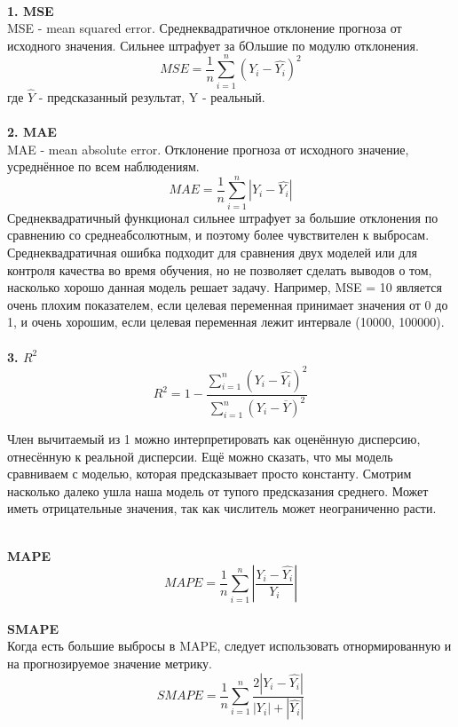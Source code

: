 \ \\\textbf{1. MSE}
\\MSE - mean squared error. Среднеквадратичное отклонение прогноза от исходного значения. Сильнее штрафует за
бОльшие по модулю отклонения.
$$MSE =\frac{1}{n}\sum\limits_{i=1}^{n}(Y_i -\hat{Y_i})^2$$
где $\hat{Y}$ - предсказанный результат, Y - реальный.
\\
\\
\textbf{2. MAE}
\\
MAE - mean absolute error. Отклонение прогноза от исходного значение, усреднённое по всем наблюдениям.
$$MAE =\frac{1}{n}\sum\limits_{i=1}^{n}|Y_i -\hat{Y_i}|$$
Среднеквадратичный функционал сильнее штрафует за большие отклонения по сравнению со среднеабсолютным, и
поэтому более чувствителен к выбросам.
Среднеквадратичная ошибка подходит для сравнения двух моделей или для контроля качества во время обучения, но
не позволяет сделать выводов о том, насколько хорошо данная модель решает задачу. Например, MSE = 10 является очень
плохим показателем, если целевая переменная принимает значения от 0 до 1, и очень хорошим, если целевая переменная
лежит интервале (10000, 100000).
\\
\\
\textbf{3. $R^2$} 
$$R^2 = 1 -
\frac{\sum\limits_{
i=1}^{n}(Y_i - \hat{Y_i})^2}{\sum\limits_{
i=1}^{n}(Y_i - \overline{Y})^2}$$

Член вычитаемый из 1 можно интерпретировать как оценённую дисперсию, отнесённую к реальной дисперсии. Ещё можно сказать, что мы модель сравниваем с моделью, которая предсказывает просто константу. Смотрим насколько далеко ушла наша модель от тупого предсказания среднего.
Может иметь отрицательные значения, так как числитель может неограниченно расти.
\begin{unnecessary}
\ \\
\textbf{MAPE}\\
$$MAPE =\frac{1}{n}\sum\limits_{
i=1}^{n}|\frac{Y_i - \hat{Y_i}}{Y_i}|$$
\\
\textbf{SMAPE}
\\
 Когда есть большие выбросы в MAPE, следует
использовать отнормированную и на прогнозируемое значение метрику.
$$SMAPE =\frac{1}{n}\sum\limits_{
i=1}^{n}\frac{2|Y_i - \hat{Y_i}|}{|Y_i| + |\hat{Y_i}|}$$
\end{unnecessary}

